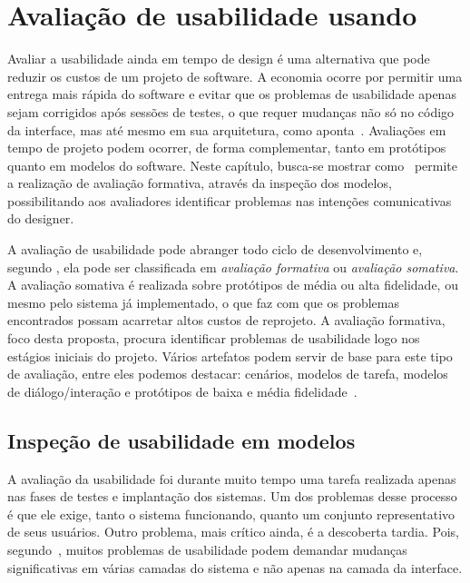 \chapter{Avaliação de usabilidade usando \aladim}
\label{usabilityEvaluation}

Avaliar a usabilidade  ainda em tempo de design  é uma alternativa que
pode reduzir os  custos de um projeto de  software.  A economia ocorre
por  permitir uma  entrega mais  rápida do  software e  evitar  que os
problemas  de  usabilidade apenas  sejam  corrigidos  após sessões  de
testes, o que  requer mudanças não só no código  da interface, mas até
mesmo   em  sua  arquitetura,   como  aponta~.
Avaliações em  tempo de projeto podem ocorrer,  de forma complementar,
tanto em  protótipos quanto em  modelos do software.   Neste capítulo,
busca-se  mostrar  como \aladim\  permite  a  realização de  avaliação
formativa,  através  da   inspeção  dos  modelos,  possibilitando  aos
avaliadores  identificar  problemas  nas  intenções  comunicativas  do
designer.

A avaliação de usabilidade pode abranger todo ciclo de desenvolvimento
e, segundo  , ela  pode ser classificada  em {\em
  avaliação  formativa}  ou  {\em  avaliação somativa}.   A  avaliação
somativa é realizada sobre protótipos  de média ou alta fidelidade, ou
mesmo pelo  sistema já  implementado, o que  faz com que  os problemas
encontrados possam  acarretar altos custos de  reprojeto.  A avaliação
formativa,  foco  desta  proposta,  procura identificar  problemas  de
usabilidade logo  nos estágios iniciais do  projeto.  Vários artefatos
podem servir de  base para este tipo de  avaliação, entre eles podemos
destacar: cenários, modelos de  tarefa, modelos de diálogo/interação e
protótipos de baixa e média fidelidade~\cite{Hix:1993}.

\section{Inspeção de usabilidade em modelos}
\label{modelsInspection}

A  avaliação  da  usabilidade  foi  durante  muito  tempo  uma  tarefa
realizada apenas nas  fases de testes e implantação  dos sistemas.  Um
dos  problemas  desse  processo  é  que ele  exige,  tanto  o  sistema
funcionando,  quanto  um  conjunto  representativo de  seus  usuários.
Outro  problema, mais  crítico ainda,  é a  descoberta  tardia.  Pois,
segundo~,  muitos   problemas  de  usabilidade
podem demandar mudanças significativas  em várias camadas do sistema e
não apenas na camada da interface.

